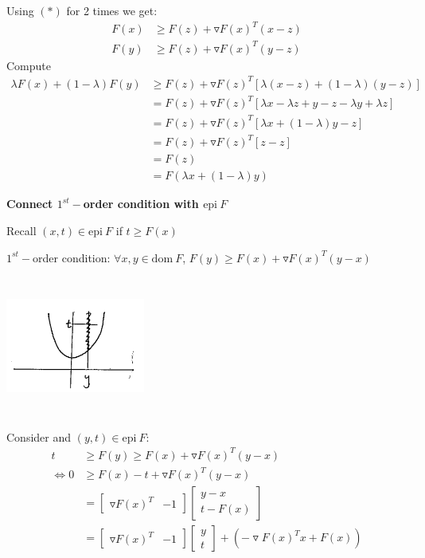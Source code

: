 Using $(*)$ for 2 times we get:
\begin{align*}
F(x) &\geq F(z) + \triangledown F(x)^T(x-z)\\
F(y) &\geq F(z) + \triangledown F(x)^T(y-z)
\end{align*} 
Compute
\begin{align*}
\lambda F(x)+(1-\lambda)F(y) &\geq F(z) + \triangledown F(z)^T[\lambda (x-z)+(1-\lambda)(y-z)]\\
&= F(z) + \triangledown F(z)^T[\lambda x - \lambda z + y - z - \lambda y +\lambda z]\\
&= F(z) + \triangledown F(z)^T[\lambda x + (1-\lambda)y - z]\\
&= F(z) + \triangledown F(z)^T[z - z]\\
&= F(z)\\
&= F(\lambda x + (1-\lambda )y)
\end{align*}


\vspace{0.3cm}
\textbf{Connect $1^{st}-$order condition with $\text{epi}\ F$}

Recall $(x,t)\in \text{epi}\ F$ if $t\geq F(x)$

$1^{st}-$order condition: $\forall x,y \in \text{dom}\ F$, $F(y)\geq F(x) + \triangledown F(x)^T(y-x)$

\begin{marginfigure}
	\centering
	\includegraphics[width=1.8in,height=1.8in]{figures/ch08/figure1106_2.png}
\end{marginfigure}

Consider and $(y,t)\in \text{epi}\ F$:
\begin{align*}
t &\geq F(y) \geq F(x) + \triangledown F(x)^T(y-x)\\
\Leftrightarrow 0 &\geq F(x) - t + \triangledown F(x)^T(y-x)\\
&= \begin{bmatrix}
\triangledown F(x)^T & -1
\end{bmatrix}\begin{bmatrix}
y-x\\
t -F(x)
\end{bmatrix}\\
&= \begin{bmatrix}
\triangledown F(x)^T  & -1
\end{bmatrix}\begin{bmatrix}
y\\
t
\end{bmatrix} + (-\triangledown F(x)^Tx + F(x))
\end{align*}

